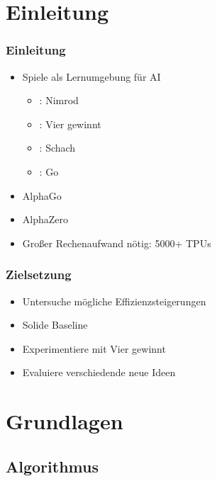 


\section{Einleitung}



\begin{frame}
 \frametitle{Einleitung}
  


\begin{itemize}
  \item \pause Spiele als Lernumgebung für AI
\begin{itemize}
  \item {}: Nimrod
  \item {}: Vier gewinnt
  \item {}: Schach
  \item {}: Go
\end{itemize}
\end{itemize}

\begin{itemize}
  \item \pause AlphaGo
  \item \pause AlphaZero
  \item \pause Großer Rechenaufwand nötig: 5000+ TPUs
\end{itemize}

  
\end{frame}
\begin{frame}
 \frametitle{Zielsetzung}
  


\begin{itemize}
  \item \pause Untersuche mögliche Effizienzsteigerungen
  \item \pause Solide Baseline
  \item \pause Experimentiere mit Vier gewinnt
  \item \pause Evaluiere verschiedende neue Ideen
\end{itemize}

  
\end{frame}

\section{Grundlagen}




\subsection{Algorithmus}



